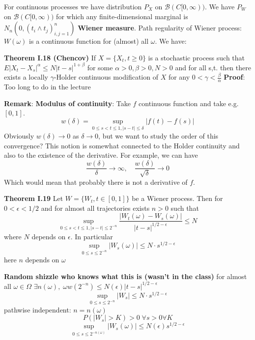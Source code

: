 \documentclass[english]{article}
\newcommand{\note}[1]{\noindent\textbf{#1}}
\newcommand{\B}{\mathcal B}
\begin{document}
For continuous processes we have distribution $P_X$ on $\B(C[0,\infty))$. We have $P_W$ on $\B(C[0,\infty))$ for which any finite-dimensional marginal is $N_n(0, (t_i \wedge t_j)^n_{i,j=1})$ \textbf{Wiener measure}.\newline
Path regularity of Wiener process: $W(\omega)$ is a continuous function for (almost) all $\omega$. We have: \newline

\note{Theorem I.18 (Chencov)} If $X=\{X_t, t\geq 0\}$ is a stochastic process such that  $E|X_t - X_s|^\alpha \leq N|t-s|^{1+\beta}$ for some $\alpha > 0, \beta > 0, N>0$ and for all s,t. then there exists a locally $\gamma$-Holder continuous modification of $X$ for any $0<\gamma < \frac{\beta}{\alpha}$ \newline
\textbf{Proof}: Too long to do in the lecture\newline

\note{Remark}: \textbf{Modulus of continuity}: Take $f$ continuous function and take e.g. $[0,1]$. 
$$w(\delta) = \sup_{0\leq s <t \leq 1, |s-t|\leq \delta} |f(t) - f(s)|$$
Obviously $w(\delta) \to 0$ as $\delta \to 0$, but we want to study the order of this convergence? This notion is somewhat connected to the Holder continuity and also to the existence of the derivative. For example, we can have
$$\frac{w(\delta)}{\delta} \to \infty,\quad \frac{w(\delta)}{\sqrt \delta} \to 0$$
Which would mean that probably there is not a derivative of $f$. \newline

\note{Theorem I.19} Let $W=\{W_t, t\in [0,1]\}$ be a Wiener process. Then for $0 < \epsilon < 1/2$ and for almost all trajectories exists $n>0$ such that
$$\sup_{0\leq s<t\leq 1, |s-t| \leq 2^{-n}} \frac{|W_t(\omega) - W_s (\omega)|}{|t-s|^{1/2 - \epsilon}} \leq N$$
where $N$ depends on $\epsilon$. In particular
$$\sup_{0\leq s \leq 2^{-n}} |W_s (\omega) | \leq N\cdot s^{1/2-\epsilon}$$
here $n$ depends on $\omega$ \newline

\note{Random shizzle who knows what this is (wasn't in the class)}
for almost all $\omega \in \Omega$ \newline
$\exists n(\omega),\; \omega w(2^{-n}) \leq N(\epsilon)|t-s|^{1/2-\epsilon}$\newline
$$\sup_{0\leq s \leq 2^{-n}} |W_s| \leq N\cdot s^{1/2-\epsilon}$$
pathwise independent: $n=n(\omega)$
$$P(|W_s|> K) > 0 \; \forall s>0 \forall K$$
$$\sup_{0\leq s \leq 2^{-n(\omega)}} |W_s(\omega) | \leq N(\epsilon) s^{1/2 - \epsilon}$$
\end{document}
